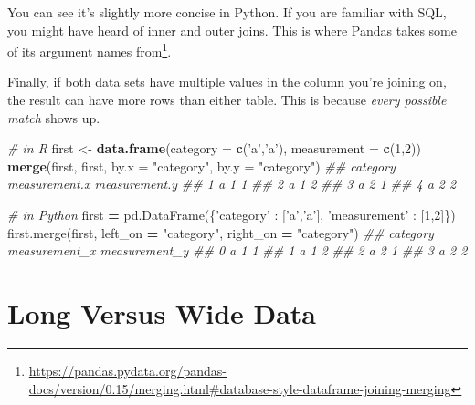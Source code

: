 \documentclass[12pt,krantz2]{krantz}
\makeatletter
\newenvironment{Shaded}{\begin{snugshade}}{\end{snugshade}}
\newcommand{\CommentTok}[1]{\textcolor[rgb]{0.37,0.37,0.37}{\textit{#1}}}
\newcommand{\DataTypeTok}[1]{\textcolor[rgb]{0.27,0.27,0.27}{#1}}
\newcommand{\DecValTok}[1]{\textcolor[rgb]{0.06,0.06,0.06}{#1}}
\newcommand{\KeywordTok}[1]{\textcolor[rgb]{0.27,0.27,0.27}{\textbf{#1}}}
\newcommand{\NormalTok}[1]{#1}
\newcommand{\OperatorTok}[1]{\textcolor[rgb]{0.43,0.43,0.43}{\textbf{#1}}}
\newcommand{\StringTok}[1]{\textcolor[rgb]{0.5,0.5,0.5}{#1}}
\renewcommand{\href}[2]{#2\footnote{\url{#1}}}
\newenvironment{kframe}{%
\medskip{}
\setlength{\fboxsep}{.8em}
 \def\at@end@of@kframe{}%
 \ifinner\ifhmode%
  \def\at@end@of@kframe{\end{minipage}}%
  \begin{minipage}{\columnwidth}%
 \fi\fi%
 \def\FrameCommand##1{\hskip\@totalleftmargin \hskip-\fboxsep
 \colorbox{shadecolor}{##1}\hskip-\fboxsep
     \hskip-\linewidth \hskip-\@totalleftmargin \hskip\columnwidth}%
 \MakeFramed {\advance\hsize-\width
   \@totalleftmargin\z@ \linewidth\hsize
   \@setminipage}}%
 {\par\unskip\endMakeFramed%
 \at@end@of@kframe}
\renewenvironment{Shaded}{\begin{kframe}}{\end{kframe}}
\makeatother
\begin{document}
You can see it's slightly more concise in Python. If you are familiar with SQL, you might have heard of inner and outer joins. This is where Pandas \href{https://pandas.pydata.org/pandas-docs/version/0.15/merging.html\#database-style-dataframe-joining-merging}{takes some of its argument names from}.

Finally, if both data sets have multiple values in the column you're joining on, the result can have more rows than either table. This is because \emph{every possible match} shows up.

\begin{Shaded}
\begin{Highlighting}[]
\CommentTok{# in R}
\NormalTok{first <-}\StringTok{ }\KeywordTok{data.frame}\NormalTok{(}\DataTypeTok{category =} \KeywordTok{c}\NormalTok{(}\StringTok{'a'}\NormalTok{,}\StringTok{'a'}\NormalTok{), }\DataTypeTok{measurement =} \KeywordTok{c}\NormalTok{(}\DecValTok{1}\NormalTok{,}\DecValTok{2}\NormalTok{))}
\KeywordTok{merge}\NormalTok{(first, first, }\DataTypeTok{by.x =} \StringTok{"category"}\NormalTok{, }\DataTypeTok{by.y =} \StringTok{"category"}\NormalTok{)}
\CommentTok{##   category measurement.x measurement.y}
\CommentTok{## 1        a             1             1}
\CommentTok{## 2        a             1             2}
\CommentTok{## 3        a             2             1}
\CommentTok{## 4        a             2             2}
\end{Highlighting}
\end{Shaded}

\begin{Shaded}
\begin{Highlighting}[]
\CommentTok{# in Python}
\NormalTok{first }\OperatorTok{=}\NormalTok{ pd.DataFrame(\{}\StringTok{'category'}\NormalTok{ : [}\StringTok{'a'}\NormalTok{,}\StringTok{'a'}\NormalTok{], }\StringTok{'measurement'}\NormalTok{ : [}\DecValTok{1}\NormalTok{,}\DecValTok{2}\NormalTok{]\})}
\NormalTok{first.merge(first, left_on }\OperatorTok{=} \StringTok{"category"}\NormalTok{, right_on }\OperatorTok{=} \StringTok{"category"}\NormalTok{)}
\CommentTok{##   category  measurement_x  measurement_y}
\CommentTok{## 0        a              1              1}
\CommentTok{## 1        a              1              2}
\CommentTok{## 2        a              2              1}
\CommentTok{## 3        a              2              2}
\end{Highlighting}
\end{Shaded}

\hypertarget{long-versus-wide-data}{%
\section{Long Versus Wide Data}\label{long-versus-wide-data}}
\end{document}
